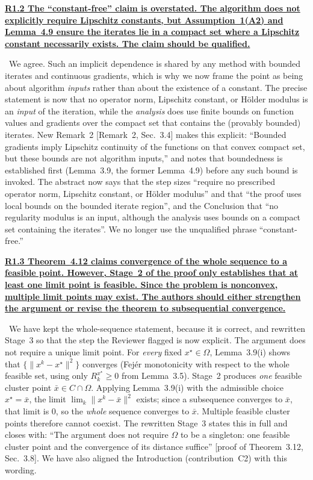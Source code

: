 \documentclass[11pt]{article}
\newcommand{\response}[1]{\smallskip\noindent{\color{blue!60!black}\textbf{Response.}}\ #1\par\medskip}
\newcommand{\loc}[1]{\textcolor{blue!50!black}{[#1]}}
\newenvironment{point}[1]{\medskip\noindent\textbf{\uline{#1}}\par}{\par}
\begin{document}
\begin{point}{R1.2 The ``constant-free'' claim is overstated. The algorithm does not
explicitly require Lipschitz constants, but Assumption~1(A2) and Lemma~4.9 ensure the
iterates lie in a compact set where a Lipschitz constant necessarily exists. The claim
should be qualified.}
\response{We agree. Such an implicit dependence is shared by any method with bounded
iterates and continuous gradients, which is why we now frame the point as being about
algorithm \emph{inputs} rather than about the existence of a constant. The precise statement is now that no
operator norm, Lipschitz constant, or H\"older modulus is an \emph{input} of the
iteration, while the \emph{analysis} does use finite bounds on function values and
gradients over the compact set that contains the (provably bounded) iterates. New
Remark~2 \loc{Remark~2, Sec.~3.4} makes this explicit: ``Bounded gradients imply
Lipschitz continuity of the functions on that convex compact set, but these bounds are
not algorithm inputs,'' and notes that boundedness is established first (Lemma~3.9, the
former Lemma~4.9) before any such bound is invoked. The abstract now says that the
step sizes ``require no prescribed operator norm, Lipschitz constant, or H\"older modulus''
and that ``the proof uses local bounds on the bounded iterate region'', and the Conclusion
that ``no regularity modulus is an input, although the analysis uses bounds on a compact
set containing the iterates''. We no longer use the unqualified phrase ``constant-free.''}
\end{point}

\begin{point}{R1.3 Theorem~4.12 claims convergence of the whole sequence to a feasible
point. However, Stage~2 of the proof only establishes that at least one limit point is
feasible. Since the problem is nonconvex, multiple limit points may exist. The authors
should either strengthen the argument or revise the theorem to subsequential
convergence.}
\response{We have kept the whole-sequence statement, because it is correct, and rewritten
Stage~3 so that the step the Reviewer flagged is now explicit. The argument does not
require a unique limit point. For \emph{every} fixed $x^\star\in\Omega$, Lemma~3.9(i)
shows that $\{\lVert x^k-x^\star\rVert^2\}$ converges (Fej\'er monotonicity with respect
to the whole feasible set, using only $R^{x^\star}_k\ge0$ from Lemma~3.5). Stage~2
produces \emph{one} feasible cluster point $\bar x\in C\cap\Omega$. Applying Lemma~3.9(i)
with the admissible choice $x^\star=\bar x$, the limit $\lim_k\lVert x^k-\bar x\rVert^2$
exists; since a subsequence converges to $\bar x$, that limit is $0$, so the \emph{whole}
sequence converges to $\bar x$. Multiple feasible cluster points therefore cannot coexist.
The rewritten Stage~3 states this in full and closes with: ``The argument does not
require $\Omega$ to be a singleton: one feasible cluster point and the convergence of its
distance suffice'' \loc{proof of Theorem~3.12,
Sec.~3.8}. We have also aligned the Introduction (contribution~C2) with this wording.}
\end{point}
\end{document}

